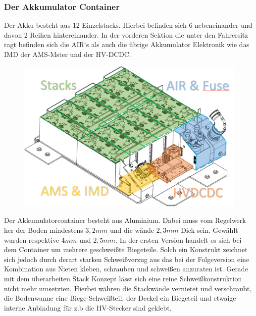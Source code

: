 \FloatBarrier
\subsubsection{Der Akkumulator Container}

Der Akku besteht aus 12 Einzelstacks. Hierbei befinden sich 6 nebeneinander und davon 2 Reihen hintereinander. In der vorderen Sektion die unter den Fahrersitz ragt befinden sich die \ac{AIR}`s als auch die übrige Akkumulator Elektronik wie das \ac{IMD} der \ac{AMS}-Mster und der \ac{HV}-DCDC.

\begin{figure}
	\centering
	\includegraphics[width=0.7\linewidth]{bilder/HV_Akkumulator_Layout}
	\caption{}
	\label{fig:hvakkumulatorlayout}
\end{figure}


Der Akkumulatorcontainer besteht aus Aluminium. Dabei muss vom Regelwerk her der Boden mindestens \ensuremath{3,2 mm} und die wände \ensuremath{2,3 mm} Dick sein. Gewählt wurden respektive \ensuremath{4 mm} und \ensuremath{2,5 mm}. In der ersten Version handelt es sich bei dem Container um mehrere geschweißte Biegeteile. Solch ein Konstrukt zeichnet sich jedoch durch derart starken Schweißverzug aus das bei der Folgeversion eine Kombination aus Nieten kleben, schrauben und schweißen anzuraten ist. Gerade mit dem überarbeiten Stack Konzept lässt sich eine reine Schweißkonstruktion nicht mehr umsetzten. Hierbei währen die Stackwände vernietet und verschraubt, die Bodenwanne eine Biege-Schweißteil, der Deckel ein Biegeteil und etwaige interne Anbindung für z.b die \ac{HV}-Stecker sind geklebt.

